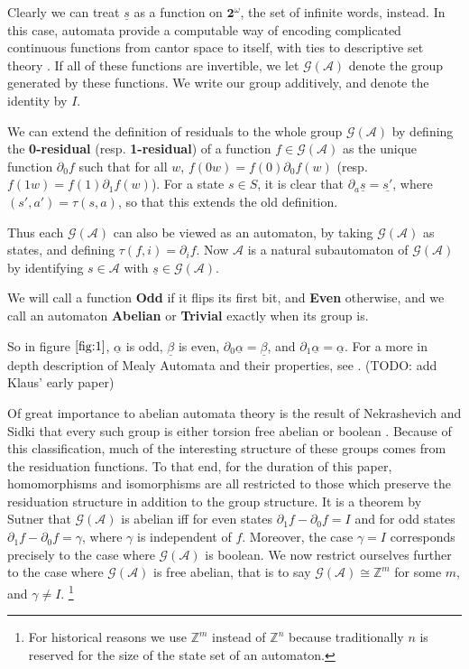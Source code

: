 \documentclass[runningheads]{llncs}
\newcommand{\A}{\mathcal{A}}
\newcommand{\G}{\mathcal{G}}
\newcommand{\Z}{\mathbb{Z}}
\newcommand{\2}{\textbf{2}}
\newcommand{\del}{\partial}
\begin{document}
Clearly we can treat $\underline{s}$ as a function 
on $\2^\omega$, the set of infinite words, instead. In this case, automata 
provide a computable way of encoding complicated continuous functions from 
cantor space to itself, with ties to descriptive set theory%
\cite{skrzypczak15:descriptive}. If all of these functions are invertible, 
we let $\G(\A)$ denote the group generated by these functions. We write our
group additively, and denote the identity by $I$.

We can extend the definition of residuals to the whole group $\G(\A)$ by
defining the \textbf{0-residual} (resp. \textbf{1-residual}) of a 
function $f \in \G(\A)$ as the unique function 
$\del_0 f$ such that for all $w$, $f(0w) = f(0) \del_0 f(w)$ 
(resp. $f(1w) = f(1) \del_1 f(w)$). 
For a state $s \in S$, it is clear that 
$\del_a \underline{s} = \underline{s'}$, where $(s',a') = \tau(s,a)$, so
that this extends the old definition. 

Thus each $\G(\A)$ can also be viewed as an automaton, by taking $\G(\A)$ 
as states, and defining $\tau(f,i) = \del_i f$. Now $\A$ is a natural 
subautomaton of $\G(\A)$ by identifying $s \in \A$ with 
$\underline{s} \in \G(\A)$.

We will call a function \textbf{Odd} if it flips its first bit, and 
\textbf{Even} otherwise, and we call an automaton \textbf{Abelian} or 
\textbf{Trivial} exactly when its group is. 

So in figure $\ref{fig:1}$, $\underline{\alpha}$ is odd, $\underline{\beta}$ 
is even, $\del_0 \underline{\alpha} = \underline{\beta}$, 
and $\del_1 \underline{\alpha} = \underline{\alpha}$.
For a more in depth description of Mealy Automata and their properties, 
see \cite{Sakarovitch09:automata_theory,Holcombe}. (TODO: add Klaus' early paper)

Of great importance to abelian automata theory is the result of 
Nekrashevich and Sidki that every such group is either torsion free abelian or 
boolean \cite{NekrashevychSidki04:automorphisms}. Because of this classification, 
much of the interesting structure of these groups comes from the residuation
functions. To that end, for the duration of this paper, 
homomorphisms and isomorphisms are all restricted to those 
which preserve the residuation structure in addition to the group structure.
It is a theorem by Sutner \cite{Sutner18:abelian_automata} 
that $\G(\A)$ is abelian iff for even states $\del_1 f - \del_0 f = I$ 
and for odd states $\del_1 f - \del_0 f = \gamma$, where $\gamma$ is 
independent of $f$. Moreover, the case $\gamma = I$ corresponds 
precisely to the case where $\G(\A)$ is boolean.
We now restrict ourselves further to the case where $\G(\A)$ is 
free abelian, that is to say $\G(\A) \cong \Z^m$ for some $m$,
and $\gamma \not = I$.%
\footnote%
{%
  For historical reasons we use $\Z^m$ instead of $\Z^n$ because 
  traditionally $n$ is reserved for the size of the state set of 
  an automaton.
}
\end{document}
